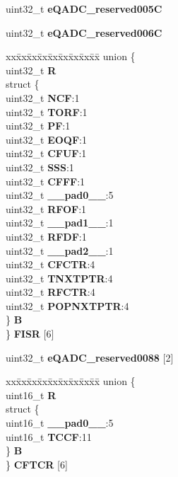 \begin{DoxyCompactItemize}
uint32\+\_\+t {\bfseries e\+Q\+A\+D\+C\+\_\+reserved005C}
\item 
\mbox{\label{structEQADC__tag_a851b72052c71f435a8b4c5c158f9fd24}} 
uint32\+\_\+t {\bfseries e\+Q\+A\+D\+C\+\_\+reserved006C}
\item 
\mbox{\label{structEQADC__tag_adc6e0888bd935d2bd09ee08e35216cb0}} 
\begin{tabbing}
xx\=xx\=xx\=xx\=xx\=xx\=xx\=xx\=xx\=\kill
union \{\\
\>uint32\_t {\bfseries R}\\
\>struct \{\\
\>\>uint32\_t {\bfseries NCF}:1\\
\>\>uint32\_t {\bfseries TORF}:1\\
\>\>uint32\_t {\bfseries PF}:1\\
\>\>uint32\_t {\bfseries EOQF}:1\\
\>\>uint32\_t {\bfseries CFUF}:1\\
\>\>uint32\_t {\bfseries SSS}:1\\
\>\>uint32\_t {\bfseries CFFF}:1\\
\>\>uint32\_t {\bfseries \_\_pad0\_\_}:5\\
\>\>uint32\_t {\bfseries RFOF}:1\\
\>\>uint32\_t {\bfseries \_\_pad1\_\_}:1\\
\>\>uint32\_t {\bfseries RFDF}:1\\
\>\>uint32\_t {\bfseries \_\_pad2\_\_}:1\\
\>\>uint32\_t {\bfseries CFCTR}:4\\
\>\>uint32\_t {\bfseries TNXTPTR}:4\\
\>\>uint32\_t {\bfseries RFCTR}:4\\
\>\>uint32\_t {\bfseries POPNXTPTR}:4\\
\>\} {\bfseries B}\\
\} {\bfseries FISR} \mbox{[}6\mbox{]}\\

\end{tabbing}\item 
\mbox{\label{structEQADC__tag_a975aa2968151c42b302368cf1b7066a4}} 
uint32\+\_\+t {\bfseries e\+Q\+A\+D\+C\+\_\+reserved0088} \mbox{[}2\mbox{]}
\item 
\mbox{\label{structEQADC__tag_a84414951ed3d8c2625c130a1e1c44f74}} 
\begin{tabbing}
xx\=xx\=xx\=xx\=xx\=xx\=xx\=xx\=xx\=\kill
union \{\\
\>uint16\_t {\bfseries R}\\
\>struct \{\\
\>\>uint16\_t {\bfseries \_\_pad0\_\_}:5\\
\>\>uint16\_t {\bfseries TCCF}:11\\
\>\} {\bfseries B}\\
\} {\bfseries CFTCR} \mbox{[}6\mbox{]}\\


\end{tabbing}
\end{DoxyCompactItemize}
